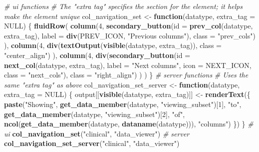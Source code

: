 \documentclass[]{article}
\newenvironment{Shaded}{\begin{snugshade}}{\end{snugshade}}
\newcommand{\KeywordTok}[1]{\textcolor[rgb]{0.13,0.29,0.53}{\textbf{#1}}}
\newcommand{\DataTypeTok}[1]{\textcolor[rgb]{0.13,0.29,0.53}{#1}}
\newcommand{\DecValTok}[1]{\textcolor[rgb]{0.00,0.00,0.81}{#1}}
\newcommand{\StringTok}[1]{\textcolor[rgb]{0.31,0.60,0.02}{#1}}
\newcommand{\CommentTok}[1]{\textcolor[rgb]{0.56,0.35,0.01}{\textit{#1}}}
\newcommand{\OtherTok}[1]{\textcolor[rgb]{0.56,0.35,0.01}{#1}}
\newcommand{\ControlFlowTok}[1]{\textcolor[rgb]{0.13,0.29,0.53}{\textbf{#1}}}
\newcommand{\NormalTok}[1]{#1}
\begin{document}
\begin{Shaded}
\begin{Highlighting}[]
\CommentTok{# ui functions}
\CommentTok{# The "extra tag" specifies the section for the element; it helps make the element unique}
\NormalTok{col_navigation_set <-}\StringTok{ }\ControlFlowTok{function}\NormalTok{(datatype, }\DataTypeTok{extra_tag =} \OtherTok{NULL}\NormalTok{) \{}
  \KeywordTok{fluidRow}\NormalTok{(}
    \KeywordTok{column}\NormalTok{(}\DecValTok{4}\NormalTok{,}
      \KeywordTok{secondary_button}\NormalTok{(}\DataTypeTok{id =} \KeywordTok{prev_col}\NormalTok{(datatype, extra_tag), }\DataTypeTok{label =} \KeywordTok{div}\NormalTok{(PREV_ICON, }\StringTok{"Previous columns"}\NormalTok{), }\DataTypeTok{class =} \StringTok{"prev_cols"}\NormalTok{)}
\NormalTok{    ),}
    \KeywordTok{column}\NormalTok{(}\DecValTok{4}\NormalTok{,}
      \KeywordTok{div}\NormalTok{(}\KeywordTok{textOutput}\NormalTok{(}\KeywordTok{visible}\NormalTok{(datatype, extra_tag)), }\DataTypeTok{class =} \StringTok{"center_align"}\NormalTok{)}
\NormalTok{    ),}
    \KeywordTok{column}\NormalTok{(}\DecValTok{4}\NormalTok{,}
      \KeywordTok{div}\NormalTok{(}\KeywordTok{secondary_button}\NormalTok{(}\DataTypeTok{id =} \KeywordTok{next_col}\NormalTok{(datatype, extra_tag), }\DataTypeTok{label =} \StringTok{"Next columns"}\NormalTok{, }\DataTypeTok{icon =}\NormalTok{ NEXT_ICON, }\DataTypeTok{class =} \StringTok{"next_cols"}\NormalTok{), }\DataTypeTok{class =} \StringTok{"right_align"}\NormalTok{)}
\NormalTok{    )}
\NormalTok{  )}
\NormalTok{\}}
\CommentTok{# server functions}
\CommentTok{# Uses the same "extra tag" as above}
\NormalTok{col_navigation_set_server <-}\StringTok{ }\ControlFlowTok{function}\NormalTok{(datatype, }\DataTypeTok{extra_tag =} \OtherTok{NULL}\NormalTok{) \{}
\NormalTok{  output[[}\KeywordTok{visible}\NormalTok{(datatype, extra_tag)]] <-}\StringTok{ }\KeywordTok{renderText}\NormalTok{(\{}
    \KeywordTok{paste}\NormalTok{(}\StringTok{"Showing"}\NormalTok{, }
          \KeywordTok{get_data_member}\NormalTok{(datatype, }\StringTok{"viewing_subset"}\NormalTok{)[}\DecValTok{1}\NormalTok{], }\StringTok{"to"}\NormalTok{, }
          \KeywordTok{get_data_member}\NormalTok{(datatype, }\StringTok{"viewing_subset"}\NormalTok{)[}\DecValTok{2}\NormalTok{], }\StringTok{"of"}\NormalTok{, }
          \KeywordTok{ncol}\NormalTok{(}\KeywordTok{get_data_member}\NormalTok{(datatype, }\KeywordTok{dataname}\NormalTok{(datatype))), }
          \StringTok{"columns"}\NormalTok{)}
\NormalTok{  \})}
\NormalTok{\}}
\CommentTok{# ui}
\KeywordTok{col_navigation_set}\NormalTok{(}\StringTok{"clinical"}\NormalTok{, }\StringTok{"data_viewer"}\NormalTok{)}
\CommentTok{# server}
\KeywordTok{col_navigation_set_server}\NormalTok{(}\StringTok{"clinical"}\NormalTok{, }\StringTok{"data_viewer"}\NormalTok{)}
\end{Highlighting}
\end{Shaded}
\end{document}
